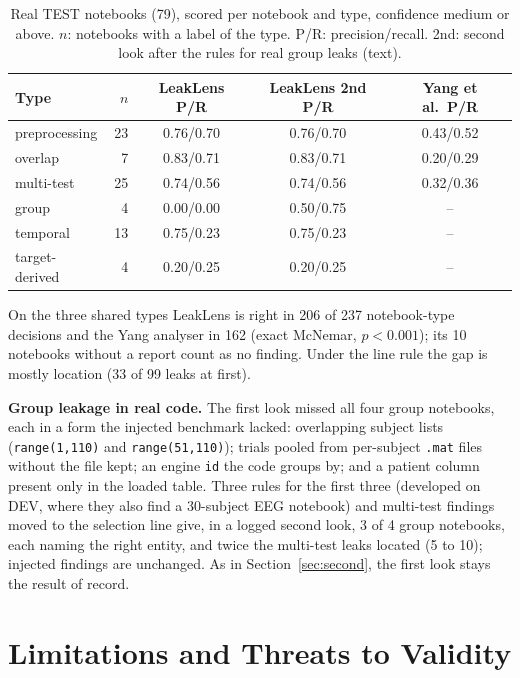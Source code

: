 \documentclass[10pt,a4paper,twocolumn]{article}
\newcommand{\tool}{LeakLens}
\newcommand{\code}[1]{\texttt{#1}}
\begin{document}
\begin{table}[t]
\centering
\caption{Real TEST notebooks (79), scored per notebook and type, confidence medium or above. $n$: notebooks with a
label of the type. P/R: precision/recall. 2nd: second look after the rules for real group leaks (text).}
\label{tab:real}
\footnotesize
\setlength{\tabcolsep}{3.5pt}
\begin{tabular}{@{}lrccc@{}}
\toprule
Type & $n$ & \tool{} P/R & \tool{} 2nd P/R & Yang et al.\ P/R \\
\midrule
preprocessing & 23 & 0.76/0.70 & 0.76/0.70 & 0.43/0.52 \\
overlap & 7 & 0.83/0.71 & 0.83/0.71 & 0.20/0.29 \\
multi-test & 25 & 0.74/0.56 & 0.74/0.56 & 0.32/0.36 \\
group & 4 & 0.00/0.00 & 0.50/0.75 & -- \\
temporal & 13 & 0.75/0.23 & 0.75/0.23 & -- \\
target-derived & 4 & 0.20/0.25 & 0.20/0.25 & -- \\
\bottomrule
\end{tabular}
\end{table}

On the three shared types \tool{} is right in 206 of 237 notebook-type decisions and the Yang analyser in 162
(exact McNemar, $p<0.001$); its 10 notebooks without a report count as no finding. Under the line rule the gap is mostly location (33 of 99 leaks at first).

\textbf{Group leakage in real code.} The first look missed all four group notebooks, each in a
form the injected benchmark lacked: overlapping subject lists (\code{range(1,110)} and \code{range(51,110)});
trials pooled from per-subject \code{.mat} files without the file kept; an engine \code{id} the code groups by;
and a patient column present only in the loaded table. Three rules for the first three (developed on DEV, where
they also find a 30-subject EEG notebook) and multi-test findings moved to the selection line give, in a logged
second look, 3 of 4 group notebooks, each naming the right entity, and twice the multi-test leaks located (5 to
10); injected findings are unchanged. As in Section~\ref{sec:second}, the first look stays the result of record.

\section{Limitations and Threats to Validity}
\end{document}
